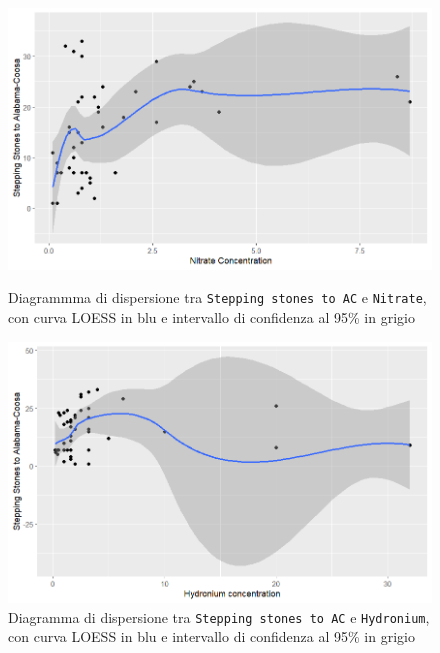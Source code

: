 \documentclass{article} %
\begin{document}
\begin{figure}[H]
    \centering
    \begin{minipage}{0.49\textwidth}
        \centering
        \includegraphics[width=\textwidth]{immagini/ac_nitrate.png}
        \captionsetup{justification=centering}
        \caption{Diagrammma di dispersione tra \texttt{Stepping stones to AC} e \texttt{Nitrate}, con curva LOESS in blu e intervallo di confidenza al 95\% in grigio}
    \end{minipage}
    \hfill
    \begin{minipage}{0.49\textwidth}
        \centering
        \includegraphics[width=\textwidth]{immagini/ac_hy.png}
        \captionsetup{justification=centering}
        \caption{Diagramma di dispersione tra \texttt{Stepping stones to AC} e \texttt{Hydronium}, con curva LOESS in blu e intervallo di confidenza al 95\% in grigio}
    \end{minipage}
\end{figure}
\end{document}
